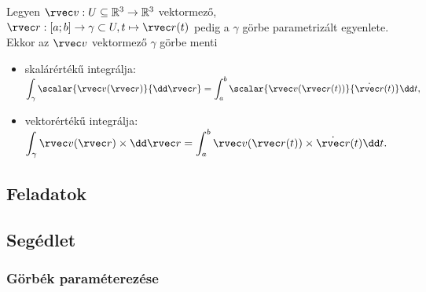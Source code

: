 \documentclass[a4paper, 12pt]{scrartcl}
\begin{document}
\begin{definition}
  Legyen $\rvec v: U \subseteq \mathbb R^3 \rightarrow \mathbb R^3$ vektormező,
  $\rvec r: [a;b] \rightarrow \gamma \subset U, t \mapsto \rvec r(t)$ pedig a
  $\gamma$ görbe parametrizált egyenlete. Ekkor az $\rvec v$ vektormező $\gamma$
  görbe menti
  \begin{itemize}
    \item skalárértékű integrálja:
          $\displaystyle
            \int_\gamma \scalar{\rvec v(\rvec r)}{\dd \rvec r} =
            \int_a^b \scalar{\rvec v(\rvec r(t))}{\dot{\rvec r}(t)} \dd t
            \text,
          $
    \item vektorértékű integrálja:
          $\displaystyle
            \int_\gamma \rvec v(\rvec r) \times \dd \rvec r =
            \int_a^b \rvec v(\rvec r(t)) \times \dot{\rvec r}(t) \dd t
            \text.
          $
  \end{itemize}
\end{definition}

\clearpage
\subsection{Feladatok}

\clearpage
\subsection{Segédlet}

\subsubsection{Görbék paraméterezése}
\end{document}
